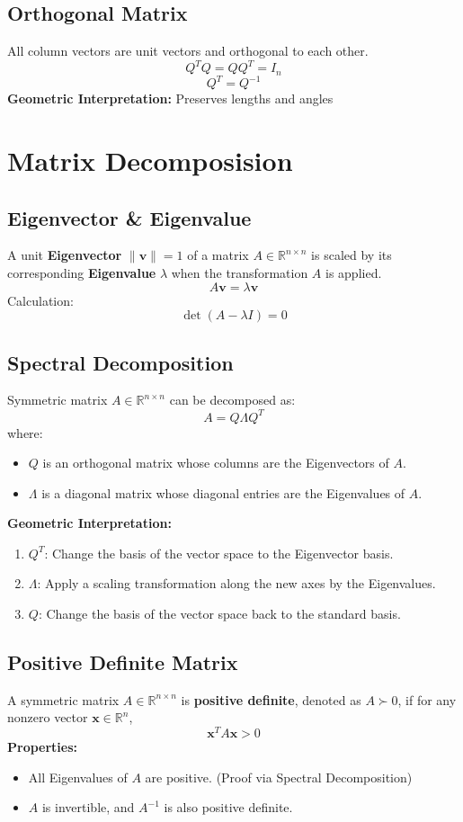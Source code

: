 \documentclass{article}
\begin{document}
\subsection{Orthogonal Matrix}
All column vectors are unit vectors and orthogonal to each other.
\[
    Q^T Q = Q Q^T = I_n
\]
\[
    Q^T = Q^{-1}
\]
\textbf{Geometric Interpretation:} Preserves lengths and angles


\newpage
\section{Matrix Decomposision}

\subsection{Eigenvector \& Eigenvalue}

A unit \textbf{Eigenvector} $\|\mathbf{v}\| = 1$ of a matrix $A \in \mathbb{R}^{n \times n}$ is scaled by its corresponding \textbf{Eigenvalue} $\lambda$ when the transformation $A$ is applied.
\[
    A\mathbf{v} = \lambda \mathbf{v}
\]
Calculation:
\[
    \det(A - \lambda I) = 0
\]

\subsection{Spectral Decomposition}

Symmetric matrix $A \in \mathbb{R}^{n \times n}$ can be decomposed as:
\[
    A = Q \Lambda Q^T
\]
where:
\begin{itemize}
    \item $Q$ is an orthogonal matrix whose columns are the Eigenvectors of $A$.
    \item $\Lambda$ is a diagonal matrix whose diagonal entries are the Eigenvalues of $A$.
\end{itemize}
\textbf{Geometric Interpretation:}
\begin{enumerate}
    \item $Q^T$: Change the basis of the vector space to the Eigenvector basis.
    \item $\Lambda$: Apply a scaling transformation along the new axes by the Eigenvalues.
    \item $Q$: Change the basis of the vector space back to the standard basis.
\end{enumerate}

\subsection{Positive Definite Matrix}
A symmetric matrix $A \in \mathbb{R}^{n \times n}$ is \textbf{positive definite}, denoted as $A \succ 0$, if for any nonzero vector $\mathbf{x} \in \mathbb{R}^n$,
\[
    \mathbf{x}^T A \mathbf{x} > 0
\]
\textbf{Properties:}
\begin{itemize}
    \item All Eigenvalues of $A$ are positive. (Proof via Spectral Decomposition)
    \item $A$ is invertible, and $A^{-1}$ is also positive definite.
\end{itemize}
\end{document}
